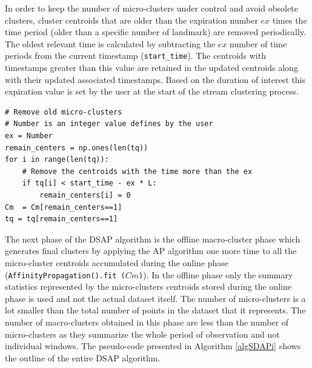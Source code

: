 In order to keep the number of micro-clusters under control and avoid obsolete clusters, cluster centroids that are older than the expiration number $ex$ times the time period (older than a specific number of landmark) are removed periodically. The oldest relevant time is calculated by subtracting the $ex$ number of time periods from the current timestamp (\texttt{start\_time}). The centroids with timestamps greater than this value are retained in the updated centroids along with their updated associated timestamps. Based on the duration of interest this expiration value is set by the user at the start of the stream clustering process. 



\begin{lstlisting}
# Remove old micro-clusters
# Number is an integer value defines by the user
ex = Number
remain_centers = np.ones(len(tq))
for i in range(len(tq)):
    # Remove the centroids with the time more than the ex
    if tq[i] < start_time - ex * L:
        remain_centers[i] = 0
Cm  = Cm[remain_centers==1]
tq = tq[remain_centers==1]
\end{lstlisting}




The next phase of the DSAP algorithm is the offline macro-cluster phase which generates final clusters by applying the AP algorithm one more time to all the micro-cluster centroids accumulated during the online phase (\texttt{AffinityPropagation().fit ($Cm$)}). In the offline phase only the summary statistics represented by the micro-clusters centroids stored during the online phase is used and not the actual dataset itself. The number of micro-clusters is a lot smaller than the total number of points in the dataset that it represents. The number of macro-clusters obtained in this phase are less than the number of micro-clusters as they summarize the whole period of observation and not individual windows. The pseudo-code presented in Algorithm \ref{algSDAPi} shows the outline of the entire DSAP algorithm. 



